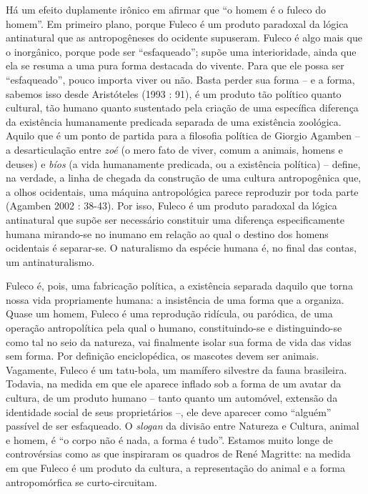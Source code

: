 Há um efeito duplamente irônico em afirmar que ``o homem é o fuleco do
homem''. Em primeiro plano, porque Fuleco é um produto paradoxal da
lógica antinatural que as antropogêneses do ocidente supuseram. Fuleco é
algo mais que o inorgânico, porque pode ser ``esfaqueado''; supõe uma
interioridade, ainda que ela se resuma a uma pura forma destacada do
vivente. Para que ele possa ser ``esfaqueado'', pouco importa viver ou
não. Basta perder sua forma -- e a forma, sabemos isso desde Aristóteles
(1993 : 91), é um produto tão político quanto cultural, tão humano
quanto sustentado pela criação de uma específica diferença da existência
humanamente predicada separada de uma existência zoológica. Aquilo que é
um ponto de partida para a filosofia política de Giorgio Agamben -- a
desarticulação entre \emph{zoé }(o mero fato de viver, comum a animais,
homens e deuses) e \emph{bíos} (a vida humanamente predicada, ou a
existência política) -- define, na verdade, a linha de chegada da
construção de uma cultura antropogênica que, a olhos ocidentais, uma
máquina antropológica parece reproduzir por toda parte (Agamben 2002 :
38-43). Por isso, Fuleco é um produto paradoxal da lógica antinatural
que supõe ser necessário constituir uma diferença especificamente humana
mirando-se no inumano em relação ao qual o destino dos homens ocidentais
é separar-se. O naturalismo da espécie humana é, no final das contas, um
antinaturalismo.

Fuleco é, pois, uma fabricação política, a existência separada daquilo
que torna nossa vida propriamente humana: a insistência de uma forma que
a organiza. Quase um homem, Fuleco é uma reprodução ridícula, ou
paródica, de uma operação antropolítica pela qual o humano,
constituindo-se e distinguindo-se como tal no seio da natureza, vai
finalmente isolar sua forma de vida das vidas sem forma. Por definição
enciclopédica, os mascotes devem ser animais. Vagamente, Fuleco é um
tatu-bola, um mamífero silvestre da fauna brasileira. Todavia, na medida
em que ele aparece inflado sob a forma de um avatar da cultura, de um
produto humano -- tanto quanto um automóvel, extensão da identidade
social de seus proprietários --, ele deve aparecer como ``alguém''
passível de ser esfaqueado. O \emph{slogan} da divisão entre Natureza e
Cultura, animal e homem, é ``o corpo não é nada, a forma é tudo''.
Estamos muito longe de controvérsias como as que inspiraram os quadros
de René Magritte: na medida em que Fuleco é um produto da
cultura, a representação do animal e a forma antropomórfica se
curto-circuitam.

